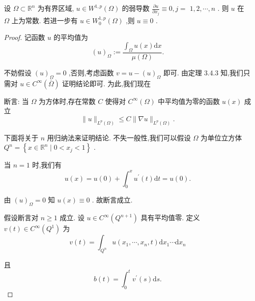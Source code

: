 \documentclass[lang=cn,newtx,10pt,scheme=chinese,thmcnt=chapter]{elegantbook}
\newcommand{\dif}{\mathrm{d}}
\begin{document}
\begin{corollary}
    设 \(\Omega  \subset  {\mathbb{R}}^{n}\) 为有界区域, \(u \in  {W}^{1,p}\left( \Omega \right)\) 的弱导数 \(\frac{\partial u}{\partial {x}_{j}} \equiv  0,j =\)  \(1,2,\cdots ,n\) . 则 \(u\) 在 \(\Omega\) 上为常数. 若进一步有 \(u \in  {W}_{0}^{1,p}\left( \Omega \right)\) ,则 \(u \equiv  0\) .
\end{corollary}
\begin{proof}
    记函数 \(u\) 的平均值为
\begin{equation*}
{\left( u\right) }_{\Omega } \mathrel{\text{ := }} \frac{{\int }_{\Omega }u\left( x\right) {\dif x}}{\mu \left( \Omega \right) }.
\end{equation*}

不妨假设 \({\left( u\right) }_{\Omega } = 0\) ,否则,考虑函数 \(v = u - {\left( u\right) }_{\Omega }\) 即可. 由定理 3.4.3 知,我们只需对 \(u \in  {C}^{\infty }\left( \bar{\Omega }\right)\) 证明结论即可. 为此,我们现在

断言: 当 \(\Omega\) 为方体时,存在常数 \(C\) 使得对 \({C}^{\infty }\left( \Omega \right)\) 中平均值为零的函数 \(u\left( x\right)\) 成立
\begin{equation*}
\parallel u{\parallel }_{{L}^{p}\left( \Omega \right) } \leqslant  C\parallel \nabla u{\parallel }_{{L}^{p}\left( \Omega \right) }.
\end{equation*}

下面将关于 \(n\) 用归纳法来证明结论. 不失一般性,我们可以假设 \(\Omega\) 为单位立方体 \({Q}^{n} = \left\{  {x \in  {\mathbb{R}}^{n} \mid  0 < {x}_{j} < 1}\right\}\) .

当 \(n = 1\) 时,我们有
\begin{equation*}
u\left( x\right)  = u\left( 0\right)  + {\int }_{0}^{x}{u}^{\prime }\left( t\right) {\dif t} = u\left( 0\right) .
\end{equation*}

由 \({\left( u\right) }_{\Omega } = 0\) 知 \(u\left( x\right)  \equiv  0\) . 故断言成立.

假设断言对 \(n \geq  1\) 成立. 设 \(u \in  {C}^{\infty }\left( {Q}^{n + 1}\right)\) 具有平均值零. 定义 \(v\left( t\right)  \in  {C}^{\infty }\left( {Q}^{1}\right)\) 为
\begin{equation*}
v\left( t\right)  = {\int }_{{Q}^{n}}u\left( {{x}_{1},\cdots ,{x}_{n},t}\right) \dif x_1\cdots \dif{x}_{n}
\end{equation*}

且
\begin{equation*}
b\left( t\right)  = {\int }_{0}^{t}{v}^{\prime }\left( s\right) {\dif s}.
\end{equation*}


\end{proof}
\end{document}
